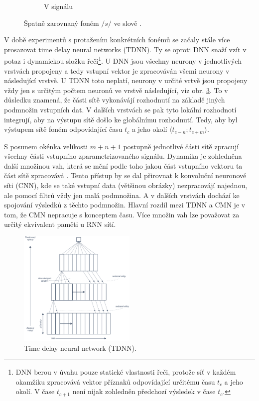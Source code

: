 \begin{figure}[htpb]
\begin{subfigure}[b]{0.55\textwidth}
    \caption{V signálu}
    \label{fig:experiments:augmentation:alignemnt:wrong:audio}
  \end{subfigure}
  \caption{Špatně zarovnaný foném $/s/$ ve slově .}
  \label{fig:experiments:augmentation:alignemnt:wrong}
\end{figure}


V době experimentů s protažením konkrétních fonémů se začaly stále více prosazovat time delay neural networks (TDNN). Ty se oproti DNN snaží vzít v potaz i dynamickou složku řeči\footnote{DNN berou v úvahu pouze statické vlastnosti řeči, protože síť v každém okamžiku zpracovává vektor příznaků odpovídající určitému času $t_c$ a jeho okolí. V čase $t_{c+1}$ není nijak zohledněn předchozí výsledek v čase $t_c$.}. U DNN jsou všechny neurony v jednotlivých vrstvách propojeny a tedy vstupní vektor je zpracováván všemi neurony v následující vrstvě. U TDNN toto neplatí, neurony v určité vrtvě jsou propojeny vždy jen s určitým počtem neuronů ve vrstvě následující, viz obr. \ref{fig:experiments:augmentation:tdnn}. To v důsledku znamená, že části sítě vykonávájí rozhodnutí na základě jiných podmnožin vstupních dat. V dalších vrstvách se pak tyto lokální rozhodnotí integrují, aby na výstupu sítě došlo ke globálnímu rozhodnutí. Tedy, aby byl výstupem sítě foném odpovídající času $t_c$ a jeho okolí $\langle t_{c-n}; t_{c+m} \rangle$.

S posunem okénka velikosti $m + n + 1$ postupně jednotlivé části sítě zpracují všechny části vstupního zparametrizovaného signálu. Dynamika je zohledněna další množinou vah, která se mění podle toho jakou část vstupního vektoru ta část sítě zpracovává \cite{Waibel1989}. Tento přístup by se dal přirovnat k konvoluční neuronové síti (CNN), kde se také vstupní data (většinou obrázky) nezpracovájí najednou, ale pomocí filtrů vždy jen malá podmnožina. A v dalších vrstvách dochází ke spojování výsledků z těchto podmnožin. Hlavní rozdíl mezi TDNN a CMN je v tom, že CMN nepracuje s konceptem času. Více množin vah lze považovat za určitý ekvivalent paměti u RNN sítí.

\begin{figure}[hbpt]
  \centering
  \includegraphics[width=0.5\textwidth]{./ch4-experiments/img/tdnn.pdf}
  \caption{Time delay neural network (TDNN).}
  \label{fig:experiments:augmentation:tdnn}
\end{figure}


